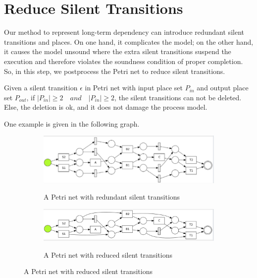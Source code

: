\section{Reduce Silent Transitions}
Our method to represent long-term dependency  can introduce redundant silent transitions and places. On one hand, it complicates the model; on the other hand, it causes the model unsound where the extra silent transitions suspend the execution and therefore violates the soundness condition of proper completion. So, in this step, we postprocess the Petri net to reduce silent transitions.
\begin{proposition}
	Given a silent transition $\epsilon$ in Petri net with input place set $P_{in}$ and output place set $P_{out}$, if $\vert P_{in} \vert \geq 2 \quad and \quad \vert P_{in} \vert \geq 2 $, the silent transitions can not be deleted. Else, the deletion is ok, and it does not damage the process model.
\end{proposition}
One example is given in the following graph. 
\begin{figure}[!h]
	\centering
	\begin{subfigure}[a]{\textwidth}
		\includegraphics[width=\textwidth]{figures/algorithm/dfg-IM-pn-with-lt.png}
		\label{fig:with-lt}
		\caption{A Petri net with redundant silent transitions}
	\end{subfigure}
	\hfill
	\begin{subfigure}[b]{\textwidth}
		\centering
		\includegraphics[width=\linewidth]{figures/algorithm/dfg-IM-pn-with-lt-reduced.png}
		\label{fig:reduced-lt}
		\caption{A Petri net with reduced silent transitions}
	\end{subfigure}
\end{figure}

